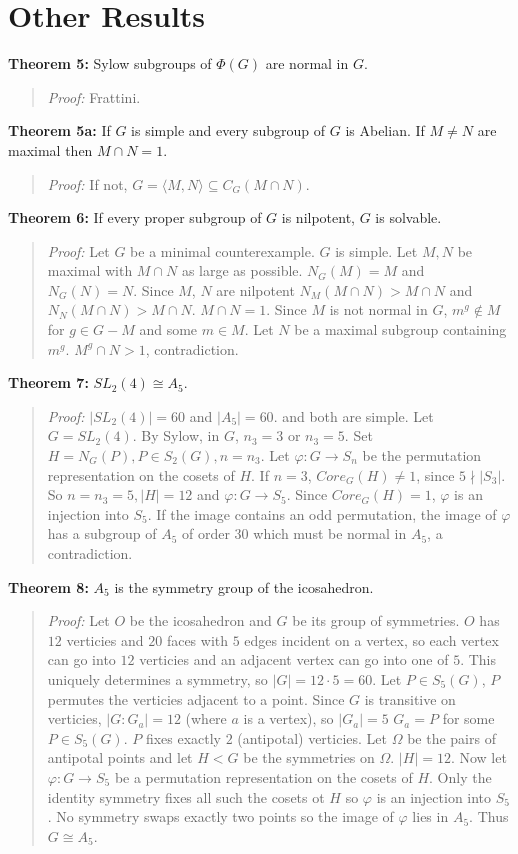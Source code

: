 \section{Other Results}
{\bf Theorem 5:}  Sylow subgroups of $\Phi(G)$ are normal in $G$.
\begin{quote}
\emph{Proof:} Frattini.
\end{quote}
{\bf Theorem 5a:}  If $G$ is simple and every subgroup of $G$ is Abelian.  If $M \ne N$ are maximal then
$M \cap N = 1$.
\begin{quote}
\emph{Proof:} If not, $G= \langle M, N \rangle  \subseteq C_G(M \cap N)$.
\end{quote}
{\bf Theorem 6:} If every proper subgroup of $G$ is nilpotent, $G$ is solvable.
\begin{quote}
\emph{Proof:} Let $G$ be a minimal counterexample.  $G$ is simple. Let $M, N$ be maximal with $M \cap N$
as large as possible.  $N_G(M)= M$ and $N_G(N)= N$.  Since $M$, $N$ are nilpotent $N_M(M \cap N) > M \cap N$ and
$N_N(M \cap N) > M \cap N$.  $M \cap N = 1$.  Since $M$ is not normal in $G$, $m^g \notin M$ for $g \in G - M$ and
some $m \in M$.  Let $N$ be a maximal subgroup containing $m^g$.  $M^g \cap N > 1$, contradiction.
\end{quote}
{\bf Theorem 7:} $SL_2(4) \cong A_5$.
\begin{quote}
\emph{Proof:}
$|SL_2(4)|=60$ and $|A_5|=60$. and both are simple.  Let $G=SL_2(4)$. By Sylow, in $G$, $n_3 = 3$ or $n_3=5$.
Set $H=N_G(P), P \in S_2(G), n=n_3$. Let $\varphi: G \rightarrow S_n$ be the permutation representation on the
cosets of $H$.  If $n=3$, $Core_G(H) \ne 1$, since $5 \nmid |S_3|$.  So $n=n_3=5, |H|=12$ and 
$\varphi: G \rightarrow S_5$.  Since $Core_G(H) = 1$, $\varphi$ is an injection into $S_5$.  If the image contains
an odd permutation, the image of $\varphi$ has a subgroup of $A_5$ of order $30$ which must be normal in
$A_5$, a contradiction.
\end{quote}
{\bf Theorem 8:} $A_5$ is the symmetry group of the icosahedron.
\begin{quote}
\emph{Proof:} Let $O$ be the icosahedron and $G$ be its group of symmetries. 
$O$ has $12$ verticies and $20$ faces with $5$ edges incident on a vertex, so each vertex can go into
$12$ verticies and an adjacent vertex can go into one of $5$. This uniquely determines a symmetry, so
$|G|= 12 \cdot 5=60$.  Let $P \in S_5(G)$, $P$ permutes the verticies adjacent to a point.  Since
$G$ is transitive on verticies, $|G:G_a|=12$ (where $a$ is a vertex), so $|G_a| = 5$ $G_a= P$ for
some $P \in S_5(G)$.  $P$ fixes exactly $2$ (antipotal) verticies.  Let $\Omega$ be the pairs of
antipotal points and let $H<G$ be the symmetries on $\Omega$. $|H| = 12$.
Now let $\varphi: G \rightarrow S_5$ be a permutation
representation on the cosets of $H$.  Only the identity symmetry fixes all such the cosets ot $H$
so $\varphi$ is an injection into $S_5$.  No symmetry swaps exactly two points so the image of
$\varphi$ lies in $A_5$.  Thus $G \cong A_5$.
\end{quote}
